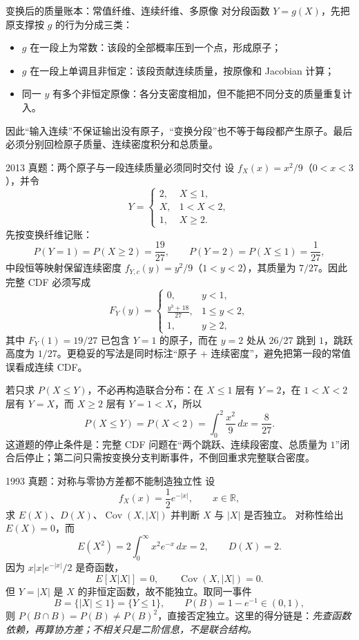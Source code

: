 \documentclass[11pt,a4paper]{ctexart}
\begin{document}
\begin{methodbox}{变换后的质量账本：常值纤维、连续纤维、多原像}
对分段函数 $Y=g(X)$，先把原支撑按 $g$ 的行为分成三类：
\begin{itemize}
  \item $g$ 在一段上为常数：该段的全部概率压到一个点，形成原子；
  \item $g$ 在一段上单调且非恒定：该段贡献连续质量，按原像和 Jacobian 计算；
  \item 同一 $y$ 有多个非恒定原像：各分支密度相加，但不能把不同分支的质量重复计入。
\end{itemize}
因此“输入连续”不保证输出没有原子，“变换分段”也不等于每段都产生原子。最后必须分别回检原子质量、连续密度积分和总质量。
\end{methodbox}

\begin{examplebox}{2013 真题：两个原子与一段连续质量必须同时交付}
设 $f_X(x)=x^2/9$（$0<x<3$），并令
\[
Y=\begin{cases}
2,&X\le1,\\
X,&1<X<2,\\
1,&X\ge2.
\end{cases}
\]
先按变换纤维记账：
\[
P(Y=1)=P(X\ge2)=\frac{19}{27},\qquad
P(Y=2)=P(X\le1)=\frac1{27},
\]
中段恒等映射保留连续密度 $f_{Y,c}(y)=y^2/9$（$1<y<2$），其质量为 $7/27$。因此完整 CDF 必须写成
\[
F_Y(y)=\begin{cases}
0,&y<1,\\
\displaystyle\frac{y^3+18}{27},&1\le y<2,\\
1,&y\ge2,
\end{cases}
\]
其中 $F_Y(1)=19/27$ 已包含 $Y=1$ 的原子，而在 $y=2$ 处从 $26/27$ 跳到 $1$，跳跃高度为 $1/27$。更稳妥的写法是同时标注“原子 + 连续密度”，避免把第一段的常值误看成连续 CDF。

若只求 $P(X\le Y)$，不必再构造联合分布：在 $X\le1$ 层有 $Y=2$，在 $1<X<2$ 层有 $Y=X$，而 $X\ge2$ 层有 $Y=1<X$，所以
\[
P(X\le Y)=P(X<2)=\int_0^2\frac{x^2}{9}\,dx=\frac8{27}.
\]
这道题的停止条件是：完整 CDF 问题在“两个跳跃、连续段密度、总质量为 $1$”闭合后停止；第二问只需按变换分支判断事件，不倒回重求完整联合密度。
\end{examplebox}

\begin{examplebox}{1993 真题：对称与零协方差都不能制造独立性}
设
\[
f_X(x)=\frac12e^{-|x|},\qquad x\in\mathbb R,
\]
求 $E(X)$、$D(X)$、$\operatorname{Cov}(X,|X|)$ 并判断 $X$ 与 $|X|$ 是否独立。
对称性给出 $E(X)=0$，而
\[
E(X^2)=2\int_0^\infty x^2e^{-x}\,dx=2,
\qquad D(X)=2.
\]
因为 $x|x|e^{-|x|}/2$ 是奇函数，
\[
E[X|X|]=0,\qquad \operatorname{Cov}(X,|X|)=0.
\]
但 $Y=|X|$ 是 $X$ 的非恒定函数，故不能独立。取同一事件
\[
B=\{|X|\le1\}=\{Y\le1\},\qquad P(B)=1-e^{-1}\in(0,1),
\]
则 $P(B\cap B)=P(B)\ne P(B)^2$，直接否定独立。这里的得分链是：\emph{先查函数依赖，再算协方差；不相关只是二阶信息，不是联合结构。}
\end{examplebox}
\end{document}
